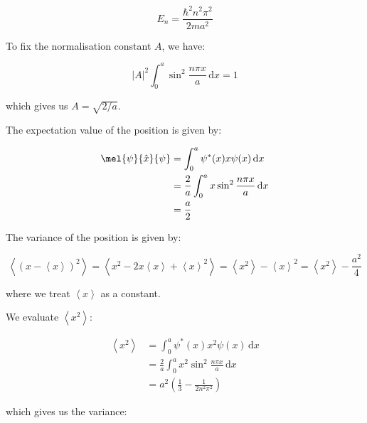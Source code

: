\documentclass[12pt]{article}
\begin{document}
\begin{equation}
    E_{n} = \frac{\hbar^{2} n^{2} \pi^{2}}{2ma^{2}}
\end{equation}

To fix the normalisation constant $A$, we have:

\begin{equation}
    \left\lvert A \right\rvert^{2} \int_{0}^{a} \sin^{2} \frac{n\pi x}{a} \, \mathrm{d}x = 1
\end{equation}

which gives us $A = \sqrt{2/a}$.


The expectation value of the position is given by:

\begin{equation}
\begin{split}
    \mel{\psi}{\hat{x}}{\psi} &= \int_{0}^{a} \psi^{*}(x) x \psi(x) \, \mathrm{d}x \\
    &= \frac{2}{a} \int_{0}^{a} x \sin^{2} \frac{n\pi x}{a} \, \mathrm{d}x \\
    &= \frac{a}{2}
\end{split}
\end{equation}


The variance of the position is given by:

\begin{equation}
    \left\langle (x - \left\langle x \right\rangle)^{2} \right\rangle = \left\langle x^{2} - 2x \left\langle x \right\rangle + \left\langle x \right\rangle^{2} \right\rangle = \left\langle x^{2} \right\rangle - \left\langle x \right\rangle^{2} = \left\langle x^{2} \right\rangle - \frac{a^{2}}{4}
\end{equation}

where we treat $\left\langle x \right\rangle$ as a constant.

We evaluate $\left\langle x^{2} \right\rangle$:

\begin{equation}
\begin{split}
    \left\langle x^{2} \right\rangle &= \int_{0}^{a} \psi^{*}(x) x^{2} \psi(x) \, \mathrm{d}x \\
    &= \frac{2}{a} \int_{0}^{a} x^{2} \sin^{2} \frac{n\pi x}{a} \, \mathrm{d}x \\
    &= a^{2} \left( \frac{1}{3} - \frac{1}{2n^{2}\pi^{2}} \right)
\end{split}
\end{equation}

which gives us the variance:
\end{document}
